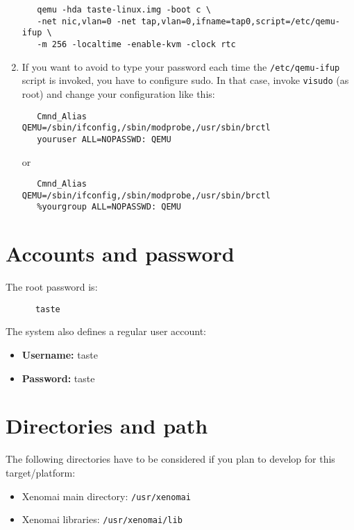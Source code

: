\documentclass[11pt]{book}
\begin{document}
\begin{enumerate}
            \begin{verbatim}
   qemu -hda taste-linux.img -boot c \
   -net nic,vlan=0 -net tap,vlan=0,ifname=tap0,script=/etc/qemu-ifup \
   -m 256 -localtime -enable-kvm -clock rtc
            \end{verbatim}

            \item
            If you want to avoid to type your password each time
            the \texttt{/etc/qemu-ifup} script is invoked, you have to configure
            sudo. In that case, invoke \texttt{visudo} (as root) and change
            your configuration like this:

            \begin{verbatim}
   Cmnd_Alias      QEMU=/sbin/ifconfig,/sbin/modprobe,/usr/sbin/brctl
   youruser ALL=NOPASSWD: QEMU
            \end{verbatim}

            or

            \begin{verbatim}
   Cmnd_Alias      QEMU=/sbin/ifconfig,/sbin/modprobe,/usr/sbin/brctl
   %yourgroup ALL=NOPASSWD: QEMU
            \end{verbatim}
         \end{enumerate}

   \section{Accounts and password}
   The root password is:
   \begin{verbatim}
      taste
   \end{verbatim}

   The system also defines a regular user account:
   \begin{itemize}
      \item
         \textbf{Username:} taste
      \item
         \textbf{Password:} taste
   \end{itemize}

   \section{Directories and path}
   The following directories have to be considered if you plan to develop for
   this target/platform:
   \begin{itemize}
      \item
         Xenomai main directory: \texttt{/usr/xenomai}
      \item
         Xenomai libraries: \texttt{/usr/xenomai/lib}
   \end{itemize}
\end{document}
